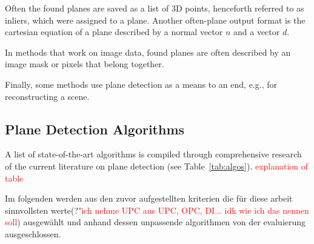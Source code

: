 \documentclass[main.tex]{subfiles}
\begin{document}
Often the found planes are saved as a list of 3D points, henceforth referred to as inliers, which were assigned to a plane.
Another often-plane output format is the cartesian equation of a plane described by a normal vector $n$ and a vector $d$.

In methods that work on image data, found planes are often described by an image mask or pixels that belong together.

Finally, some methods use plane detection as a means to an end, e.g., for reconstructing a scene.

\subsection{Plane Detection Algorithms}
\label{subsec:pdaselect}
A list of state-of-the-art algorithms is compiled through comprehensive research of the current literature on plane detection (see Table~\ref{tab:algos}).
\textcolor{red}{explanation of table}

Im folgenden werden aus den zuvor aufgestellten kriterien die für diese arbeit sinnvollsten werte(?\textcolor{red}{"ich nehme UPC aus {UPC, OPC, DI}... idk wie ich das nennen soll}) ausgewählt und anhand dessen unpassende algorithmen von der evaluierung ausgeschlossen.
\end{document}
